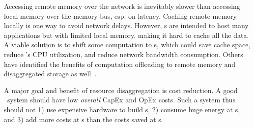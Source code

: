 Accessing remote memory over the network is inevitably slower than accessing local memory over the memory bus, esp. on latency.
Caching remote memory locally is one way to avoid network delays.
However, \CN{}s are intended to host many applications but with limited local memory, making it hard to cache all the data.
A viable solution is to shift some computation to \MN{}s, which could save \CN{} cache space, reduce \CN{}'s CPU utilization, and reduce network bandwidth consumption.
Others have identified the benefits of computation offloading to remote memory and disaggregated storage as well~\cite{XXX}.
\fi

A major goal and benefit of resource disaggregation is cost reduction.
A good \md\ system should have low {\em overall} CapEx and OpEx costs.
Such a system thus should not 1) use expensive hardware to build \MN{}s, 
2) consume huge energy at \MN{}s,
and 3) add more costs at \CN{}s than the costs saved at \MN{}s.


